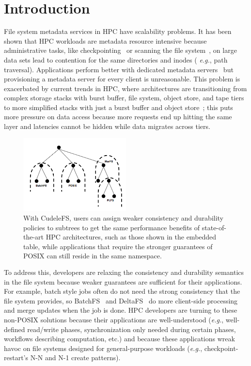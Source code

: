 \section{Introduction}

File system metadata services in HPC have scalability problems. It has been
shown that HPC workloads are metadata resource intensive because administrative
tasks, like checkpointing~\cite{bent_plfs_2009} or scanning the file
system~\cite{zheng:pdsw2014-batchfs}, on large data sets lead to contention
for the same directories and inodes ({\it
e.g.}, path traversal). Applications perform better with dedicated metadata
servers~\cite{sevilla:sc15-mantle, ren:sc2014-indexfs} but provisioning a
metadata server for every client is unreasonable. This problem is exacerbated
by current trends in HPC, where architectures are transitioning from complex
storage stacks with burst buffer, file system, object store, and tape tiers to
more simplified stacks with just a burst buffer and object
store~\cite{bent:login16-hpc-trends}; this puts more pressure on data access
because more requests end up hitting the same layer and latencies cannot be 
hidden while data migrates across tiers.

\begin{figure}[tb]
\centering
\includegraphics[width=0.5\textwidth]{figures/subtree-policies.png}
\caption{With CudeleFS, users can assign weaker consistency and durability
policies to subtrees to get the same performance benefits of state-of-the-art
HPC architectures, such as those shown in the embedded table, while
applications that require the stronger guarantees of POSIX can still reside in
the same namespace.
}\label{fig:subtree-policies}
\end{figure}


To address this, developers are relaxing the consistency and durability
semantics in the file system because weaker guarantees are sufficient for their
applications. For example, batch style jobs often do not need the strong
consistency that the file system provides, so
BatchFS~\cite{zheng:pdsw2014-batchfs} and DeltaFS~\cite{zheng:pdsw2015-deltafs}
do more client-side processing and merge updates when the job is done. HPC
developers are turning to these non-POSIX solutions because their applications
are well-understood ({\it e.g.}, well-defined read/write phases,
synchronization only needed during certain phases, workflows describing
computation, etc.) and because these applications wreak havoc on file systems designed for
general-purpose workloads ({\it e.g.}, checkpoint-restart's N-N and N-1 create
patterns).


